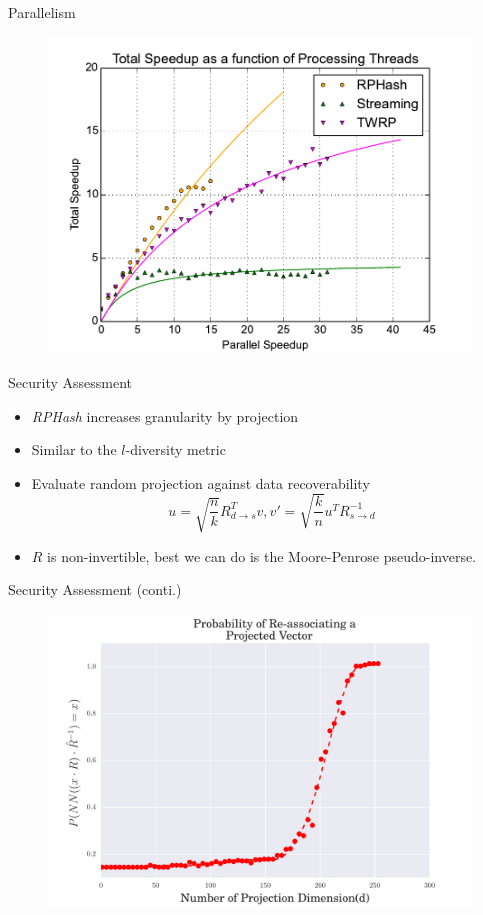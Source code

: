 \documentclass[12pt]{beamer}
\begin{document}
\begin{frame}[plain]{Parallelism}
 \begin{figure}
 \centerline{\includegraphics[width=.92\textwidth]{figs/speedup}}
\end{figure}
\end{frame}

\begin{frame}[plain]{Security Assessment}
 \begin{itemize}
 \item \emph{RPHash} increases granularity by projection
 \item Similar to the $l$-diversity metric
 \item Evaluate random projection against data recoverability
  $$ u = \sqrt{{\frac{n}{k}}}R_{d\rightarrow s}^Tv , v' = \sqrt{{\frac{k}{n}}}u^T R_{s\rightarrow d}^{-1} $$
 \item $R$ is non-invertible, best we can do is the Moore-Penrose pseudo-inverse.
\end{itemize}
\end{frame}

\begin{frame}[plain]{Security Assessment (conti.)}
 \begin{figure}
 \centerline{\includegraphics[width=1\textwidth]{figs/recovery}}
\end{figure}
\end{frame}
\end{document}

